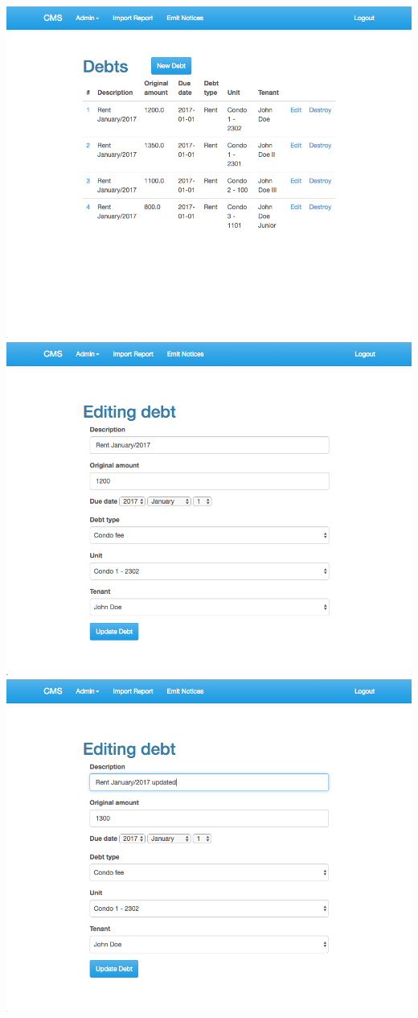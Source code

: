 \begin{itemize}
    \includegraphics[scale=0.25]{./images/ss/debt/edit/2.png}\\
    \includegraphics[scale=0.25]{./images/ss/debt/edit/3.png}
    \includegraphics[scale=0.25]{./images/ss/debt/edit/4.png}\\

\end{itemize}
